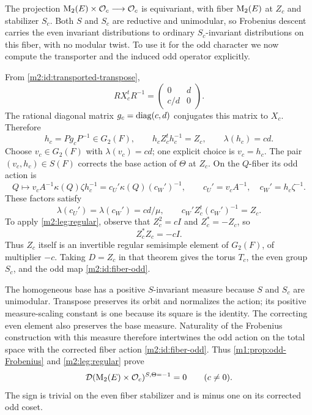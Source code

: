 The projection
$\operatorname{M}_2(E)\times\mathcal O_c\longrightarrow\mathcal O_c$
is equivariant, with fiber $\operatorname{M}_2(E)$ at $Z_c$ and stabilizer
$S_c$. Both $S$ and $S_c$ are reductive and unimodular, so Frobenius
descent carries the even invariant distributions to ordinary
$S_c$-invariant distributions on this fiber, with no modular twist.
To use it for the odd character we now compute the transporter and
the induced odd operator explicitly.

From \eqref{m2:id:transported-transpose},
\[
 RX_c^tR^{-1}=\begin{pmatrix}0&d\\c/d&0\end{pmatrix}.
\]
The rational diagonal matrix $g_c=\operatorname{diag}(c,d)$ conjugates this
matrix to $X_c$. Therefore
\begin{equation}\label{m2:id:level-transporter}
 h_c=Pg_cP^{-1}\in G_2(F),\qquad
 h_cZ_c^th_c^{-1}=Z_c,\qquad \lambda(h_c)=cd.
\end{equation}
Choose $v_c\in G_2(F)$ with $\lambda(v_c)=cd$; one explicit choice
is $v_c=h_c$. The pair $(v_c,h_c)\in S(F)$ corrects the base
action of $\Theta$ at $Z_c$. On the $Q$-fiber its odd action is
\begin{equation}\label{m2:id:fiber-odd}
 Q\longmapsto v_cA^{-1}\kappa(Q)\zeta h_c^{-1}
                 =c_U'\kappa(Q)(c_W')^{-1},
 \qquad c_U'=v_cA^{-1},\quad c_W'=h_c\zeta^{-1}.
\end{equation}
These factors satisfy
\[
 \lambda(c_U')=\lambda(c_W')=cd/\mu,
 \qquad c_W'Z_c^t(c_W')^{-1}=Z_c.
\]
To apply \cref{m2:leg:regular}, observe that $Z_c^2=cI$ and $Z_c^*=-Z_c$,
so
\[
 Z_c^*Z_c=-cI.
\]
Thus $Z_c$ itself is an invertible regular semisimple element of
$G_2(F)$, of multiplier $-c$. Taking $D=Z_c$ in that theorem gives
the torus $T_c$, the even group $S_c$, and the odd map
\eqref{m2:id:fiber-odd}.

The homogeneous base has a positive $S$-invariant measure because
$S$ and $S_c$ are unimodular. Transpose preserves its orbit and
normalizes the action; its positive measure-scaling constant is
one because its square is the identity. The correcting even
element also preserves the base measure. Naturality of the
Frobenius construction with this measure therefore intertwines
the odd action on the total space with the corrected fiber action
\eqref{m2:id:fiber-odd}.
Thus \cref{m1:prop:odd-Frobenius} and \cref{m2:leg:regular} prove
\begin{equation}\label{m2:id:nonzero-vanishing}
 \mathcal D(\operatorname{M}_2(E)\times\mathcal O_c)^{S,\Theta=-1}=0
                         \qquad(c\ne0).
\end{equation}
The sign is trivial on the even fiber stabilizer and is minus one
on its corrected odd coset.

